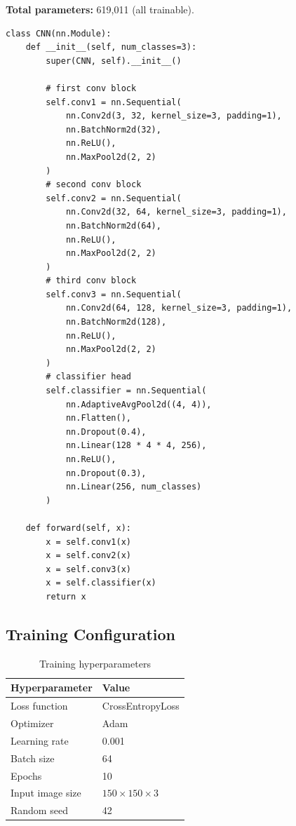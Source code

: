 \documentclass[11pt,a4paper]{article}
\begin{document}
\textbf{Total parameters:} 619,011 (all trainable).

\begin{lstlisting}[caption={CNN model definition in PyTorch}, label={lst:cnn}]
class CNN(nn.Module):
    def __init__(self, num_classes=3):
        super(CNN, self).__init__()

        # first conv block
        self.conv1 = nn.Sequential(
            nn.Conv2d(3, 32, kernel_size=3, padding=1),
            nn.BatchNorm2d(32),
            nn.ReLU(),
            nn.MaxPool2d(2, 2)
        )
        # second conv block
        self.conv2 = nn.Sequential(
            nn.Conv2d(32, 64, kernel_size=3, padding=1),
            nn.BatchNorm2d(64),
            nn.ReLU(),
            nn.MaxPool2d(2, 2)
        )
        # third conv block
        self.conv3 = nn.Sequential(
            nn.Conv2d(64, 128, kernel_size=3, padding=1),
            nn.BatchNorm2d(128),
            nn.ReLU(),
            nn.MaxPool2d(2, 2)
        )
        # classifier head
        self.classifier = nn.Sequential(
            nn.AdaptiveAvgPool2d((4, 4)),
            nn.Flatten(),
            nn.Dropout(0.4),
            nn.Linear(128 * 4 * 4, 256),
            nn.ReLU(),
            nn.Dropout(0.3),
            nn.Linear(256, num_classes)
        )

    def forward(self, x):
        x = self.conv1(x)
        x = self.conv2(x)
        x = self.conv3(x)
        x = self.classifier(x)
        return x
\end{lstlisting}

\subsection{Training Configuration}
\begin{table}[H]
\centering
\caption{Training hyperparameters}
\label{tab:hyperparams}
\begin{tabular}{ll}
\toprule
\textbf{Hyperparameter} & \textbf{Value} \\
\midrule
Loss function & CrossEntropyLoss \\
Optimizer & Adam \\
Learning rate & 0.001 \\
Batch size & 64 \\
Epochs & 10 \\
Input image size & $150 \times 150 \times 3$ \\
Random seed & 42 \\
\bottomrule
\end{tabular}
\end{table}
\end{document}

